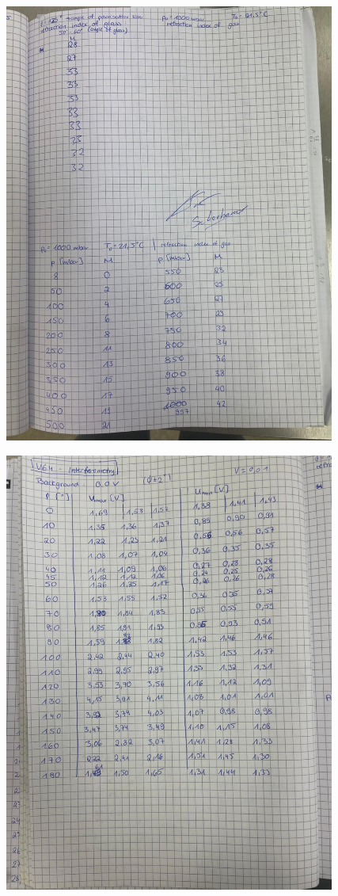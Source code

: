 \begin{figure}[H]
    \centering
    \includegraphics[width=0.97\textwidth]{Messdaten/2.pdf}
    \label{fig:Messdaten2}
\end{figure}
\begin{figure}[H]
    \centering
    \includegraphics[width=0.97\textwidth]{Messdaten/3.pdf}
    \label{fig:Messdaten3}
\end{figure}